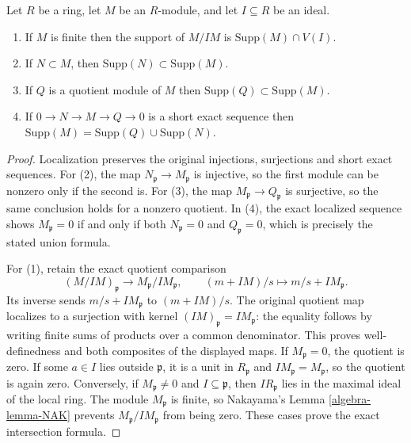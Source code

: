 \begin{lemma}
\label{editorial-source-lemma-support-quotient}
Let $R$ be a ring, let $M$ be an $R$-module, and let $I\subseteq R$ be an ideal.
\begin{enumerate}
\item If $M$ is finite then the support
of $M/IM$ is $\text{Supp}(M) \cap V(I)$.
\item If $N \subset M$, then $\text{Supp}(N) \subset
\text{Supp}(M)$.
\item If $Q$ is a quotient module of $M$ then $\text{Supp}(Q) \subset
\text{Supp}(M)$.
\item If $0 \to N \to M \to Q \to 0$ is a short exact sequence
then $\text{Supp}(M) = \text{Supp}(Q) \cup \text{Supp}(N)$.
\end{enumerate}
\end{lemma}

\begin{proof}
Localization preserves the original injections, surjections
and short exact sequences. For (2), the map
$N_{\mathfrak p}\to M_{\mathfrak p}$ is injective, so
the first module can be nonzero only if the second is.
For (3), the map $M_{\mathfrak p}\to Q_{\mathfrak p}$
is surjective, so the same conclusion holds for a nonzero
quotient. In (4), the exact localized sequence shows
$M_{\mathfrak p}=0$ if and only if both
$N_{\mathfrak p}=0$ and $Q_{\mathfrak p}=0$, which is
precisely the stated union formula.

For (1), retain the exact quotient comparison
$$
(M/IM)_{\mathfrak p}\longrightarrow M_{\mathfrak p}/IM_{\mathfrak p},
\qquad (m+IM)/s\longmapsto m/s+IM_{\mathfrak p}.
$$
Its inverse sends $m/s+IM_{\mathfrak p}$ to $(m+IM)/s$.
The original quotient map localizes to a surjection with
kernel $(IM)_{\mathfrak p}=IM_{\mathfrak p}$: the equality
follows by writing finite sums of products over a common
denominator. This proves well-definedness and both
composites of the displayed maps. If $M_{\mathfrak p}=0$,
the quotient is zero. If some $a\in I$ lies outside
$\mathfrak p$, it is a unit in $R_{\mathfrak p}$ and
$IM_{\mathfrak p}=M_{\mathfrak p}$, so the quotient is
again zero. Conversely, if $M_{\mathfrak p}\ne0$ and
$I\subseteq\mathfrak p$, then $IR_{\mathfrak p}$ lies
in the maximal ideal of the local ring. The module
$M_{\mathfrak p}$ is finite, so Nakayama's
Lemma \ref{algebra-lemma-NAK} prevents
$M_{\mathfrak p}/IM_{\mathfrak p}$ from being zero.
These cases prove the exact intersection formula.
\end{proof}